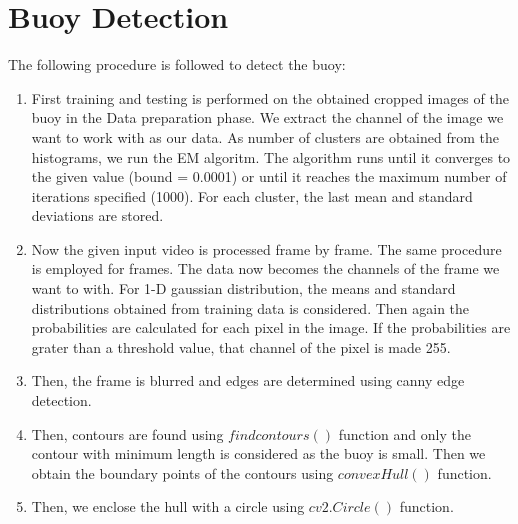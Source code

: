 \documentclass[12pt]{article}
\begin{document}
\section{Buoy Detection}
The following procedure is followed to detect the buoy:
\begin{enumerate}
\item First training and testing is performed on the obtained cropped images of the buoy in the Data preparation phase. We extract the channel of the image we want to work with as our data. As number of clusters are obtained from the histograms, we run the EM algoritm. The algorithm runs until it converges to the given value (bound = 0.0001) or until it reaches the maximum number of iterations specified (1000). For each cluster, the last mean and standard deviations are stored. 

\item Now the given input video is processed frame by frame. The same procedure is employed for frames. The data now becomes the channels of the frame we want to with. For 1-D gaussian distribution, the means and standard distributions obtained from training data is considered. Then again the probabilities are calculated for each pixel in the image. If the probabilities are grater than a threshold value, that channel of the pixel is made 255.

\item Then, the frame is blurred and edges are determined using canny edge detection.

\item Then, contours are found using $findcontours()$ function and only the contour with minimum length is considered as the buoy is small. Then we obtain the boundary points of the contours using $convexHull()$ function. 

\item Then, we enclose the hull with a circle using $cv2.Circle()$ function. 
\end{enumerate}
\newpage
\end{document}
